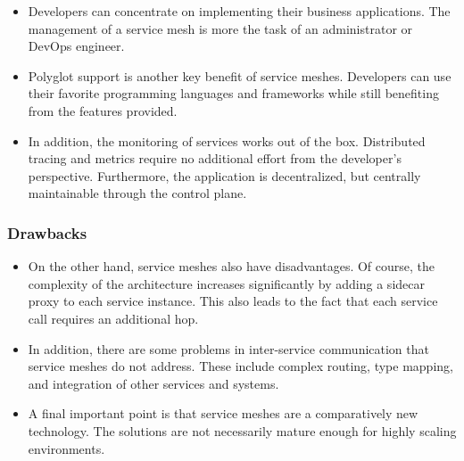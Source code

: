 \begin{itemize}

    \item Developers can concentrate on implementing their business applications. The management of a service mesh is more the task of an administrator or DevOps engineer.

    \item Polyglot support is another key benefit of service meshes. Developers can use their favorite programming languages and frameworks while still benefiting from the features provided.

    \item In addition, the monitoring of services works out of the box. Distributed tracing and metrics require no additional effort from the developer's perspective. Furthermore, the application is decentralized, but centrally maintainable through the control plane. 

\end{itemize}
\subsubsection{Drawbacks}

\begin{itemize}
    \item On the other hand, service meshes also have disadvantages. Of course, the complexity of the architecture increases significantly by adding a sidecar proxy to each service instance. This also leads to the fact that each service call requires an additional hop.
    \item In addition, there are some problems in inter-service communication that service meshes do not address. These include complex routing, type mapping, and integration of other services and systems.
    \item A final important point is that service meshes are a comparatively new technology. The solutions are not necessarily mature enough for highly scaling environments.
\end{itemize}








